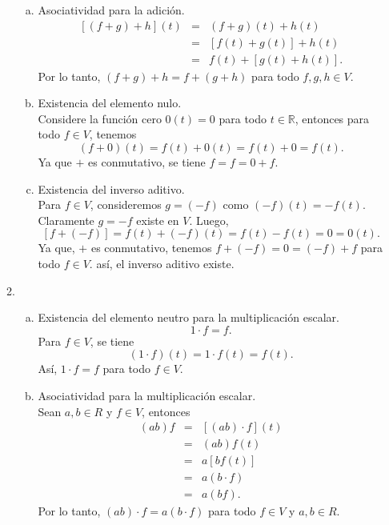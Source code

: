 \begin{enumerate}[\bfseries 1.]
\begin{enumerate}[(1)]
\begin{enumerate}[(a)]
		    \item Asociatividad para la adición.
			$$
			\begin{array}{rcl}
			    \left[(f+g)+h\right](t) &=& (f+g)(t)+h(t)\\
						    &=& \left[f(t)+g(t)\right]+h(t)\\
						    &=& f(t)+\left[g(t)+h(t)\right].
			\end{array}
			$$
			Por lo tanto, $(f+g)+h=f+(g+h)$ para todo $f,g,h\in V$.\\

		    \item Existencia del elemento nulo.\\
			Considere la función cero $0(t)=0$ para todo $t\in \mathbb{R}$, entonces para todo $f\in V$, tenemos
			$$(f+0)(t)=f(t)+0(t)=f(t)+0=f(t).$$
			Ya que $+$ es conmutativo, se tiene $f=f=0+f.$\\
			
		    \item Existencia del inverso aditivo.\\
			Para $f\in V$, consideremos $g=(-f)$ como $(-f)(t)=-f(t)$. Claramente $g=-f$ existe en $V$. Luego,
			$$\left[f+(-f)\right]=f(t)+(-f)(t)=f(t)-f(t)=0=0(t).$$
			Ya que, $+$ es conmutativo, tenemos $f+(-f)=0=(-f)+f$ para todo $f\in V$. así, el inverso aditivo existe.\\

		\end{enumerate}

	    \item 
		\begin{enumerate}[(a)]
		    \item Existencia del elemento neutro para la multiplicación escalar.\\
			$$1\cdot f =f.$$
			Para $f\in V$, se tiene
			$$(1\cdot f)(t)=1\cdot f(t)=f(t).$$
			Así, $1\cdot f = f$ para todo $f\in V$.\\

		    \item Asociatividad para la multiplicación escalar.\\
			Sean $a,b\in R$ y $f\in V$, entonces
			$$
			\begin{array}{rcl}
			    (ab)f&=& \left[(ab)\cdot f\right](t)\\
				 &=& (ab) f(t)\\
				 &=& a\left[bf(t)\right]\\
				 &=& a\left(b\cdot f\right)\\
				 &=& a\left(bf\right).
			\end{array}
			$$
			Por lo tanto, $(ab)\cdot f=a\left(b\cdot f\right)$ para todo $f\in V$ y $a,b\in R$.\\


\end{enumerate}
\end{enumerate}
\end{enumerate}
